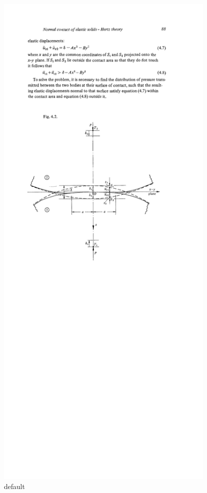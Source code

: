 \begin{figure}[ht!]
	\begin{center}
	\includegraphics[width=0.95\textwidth]{chapters/figures/hertzGeometry}
	\caption{default}
	\label{fig:hertzgeometry}
	\end{center}
\end{figure}

